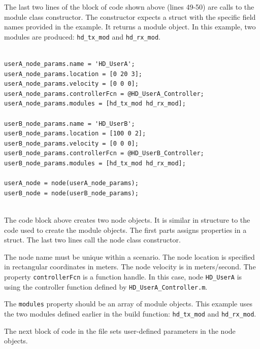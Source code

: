The last two lines of the block of code shown above (lines 49-50)
are calls to the module class constructor.  The constructor expects
a struct with the specific field names provided in the example.  It
returns a module object.  In this example, two modules are produced:
\verb+hd_tx_mod+ and \verb+hd_rx_mod+.

\begin{lstlisting}[name=hdBuildNodes]
% Define nodes

userA_node_params.name = 'HD_UserA';
userA_node_params.location = [0 20 3];
userA_node_params.velocity = [0 0 0];
userA_node_params.controllerFcn = @HD_UserA_Controller;
userA_node_params.modules = [hd_tx_mod hd_rx_mod];

userB_node_params.name = 'HD_UserB';
userB_node_params.location = [100 0 2];
userB_node_params.velocity = [0 0 0];
userB_node_params.controllerFcn = @HD_UserB_Controller;
userB_node_params.modules = [hd_tx_mod hd_rx_mod];

userA_node = node(userA_node_params);
userB_node = node(userB_node_params);


\end{lstlisting}

The code block above creates two node objects.  It is similar in
structure to the code used to create the module objects. The first
parts assigns properties in a struct.  The last two lines call the
node class constructor.

The node name must be unique within a scenario.  The node location
is specified in rectangular coordinates in meters.  The node
velocity is in meters/second.  The property \verb+controllerFcn+ is
a function handle. In this case, node \verb+HD_UserA+ is using the
controller function defined by \verb+HD_UserA_Controller.m+.

The \verb+modules+ property should be an array of module objects.
This example uses the two modules defined earlier in the build
function: \verb+hd_tx_mod+ and \verb+hd_rx_mod+.

The next block of code in the file sets user-defined parameters in
the node objects.

